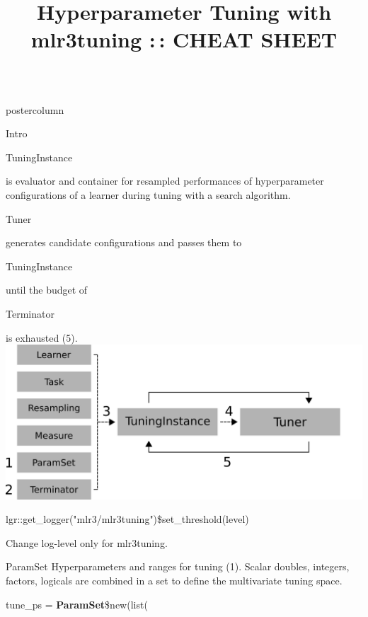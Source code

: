 \documentclass{beamer}
\title{Hyperparameter Tuning with mlr3tuning :\,: CHEAT SHEET} %
\newlength{\columnheight} %
\newcommand{\codeinline}[1]{\begin{codeboxinline}#1\end{codeboxinline}}
\begin{document}
\begin{frame}[fragile]{}
	\begin{columns}
		\begin{column}{.245\textwidth}
			\begin{beamercolorbox}[center]{postercolumn}
				\begin{minipage}{.98\textwidth}
					\parbox[t][\columnheight]{\textwidth}{
						\begin{myblock}{Intro}
							\codeinline{TuningInstance} is evaluator 
							and container for resampled performances 
							of hyperparameter configurations of a learner 
							during tuning with a search algorithm. 
                            \codeinline{Tuner} generates candidate configurations 
                            and passes them to \codeinline{TuningInstance} 
                            until the budget of \codeinline{Terminator} is exhausted (5). 
							\vspace{1em}
							\\
                            \includegraphics[width=\textwidth]{img/tuning_objects.png}
                            \\
                            \begin{codebox}
                            	{\scriptsize lgr::get\_logger("mlr3/mlr3tuning")\$set\_threshold(level)}
                            \end{codebox}
                            Change log-level only for mlr3tuning.
						\end{myblock}
						\begin{myblock}{ParamSet}
					        Hyperparameters and ranges for tuning (1). 
					        Scalar doubles, integers, factors, logicals are combined 
					        in a set to define the multivariate tuning space.
							\\
							\begin{codeboxmultiline}[width=20.75cm]
								tune\_ps = \textbf{ParamSet}\$new(list(\\

\end{codeboxmultiline}
\end{myblock}}
\end{minipage}
\end{beamercolorbox}
\end{column}
\end{columns}
\end{frame}
\end{document}
